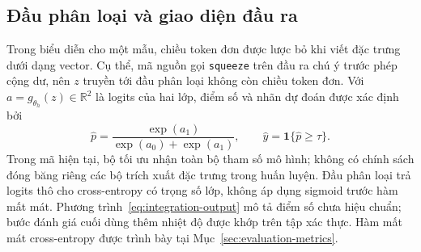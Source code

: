 \documentclass[14pt,a4paper,oneside]{extreport}
\begin{document}
%
\subsection{Đầu phân loại và giao diện đầu ra}
Trong biểu diễn cho một mẫu, chiều token đơn được lược bỏ khi viết
đặc trưng dưới dạng vector. Cụ thể, mã nguồn gọi \texttt{squeeze} trên
đầu ra chú ý trước phép cộng dư, nên $z$ truyền tới đầu phân loại
không còn chiều token đơn. Với
$a=g_{\theta_h}(z)\in\mathbb R^2$ là logits của hai lớp, điểm số
và nhãn dự đoán được xác định bởi
\begin{equation}
 \widehat p=\frac{\exp(a_1)}{\exp(a_0)+\exp(a_1)},\qquad
 \widehat y=\boldsymbol{1}\{\widehat p\geq\tau\}.
 \label{eq:integration-output}
\end{equation}
Trong mã hiện tại, bộ tối ưu nhận toàn bộ tham số mô hình; không có
chính sách đóng băng riêng các bộ trích xuất đặc trưng trong huấn luyện.
Đầu phân loại trả logits thô cho cross-entropy có trọng số lớp, không
áp dụng sigmoid trước hàm mất mát. Phương trình~\eqref{eq:integration-output}
mô tả điểm số chưa hiệu chuẩn; bước đánh giá cuối dùng thêm nhiệt độ
được khớp trên tập xác thực. Hàm mất mát cross-entropy được trình bày
tại Mục~\ref{sec:evaluation-metrics}.
\end{document}
